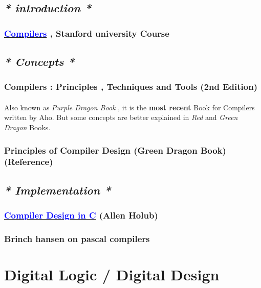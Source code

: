 \documentclass[12pt, a4paper]{article}
\begin{document}
\subsection*{\emph{* introduction *}}
\subsubsection*{\href{https://www.edx.org/course/compilers}{\textcolor{blue}{Compilers}} , Stanford university Course}
\subsection*{\emph{* Concepts *}}
\subsubsection*{Compilers : Principles , Techniques and Tools (2nd Edition)}
\paragraph{}
Also known as \emph{Purple Dragon Book} , it is the \textbf{most recent} Book for Compilers written by Aho. But some concepts are better explained in \emph{Red} and \emph{Green Dragon} Books.
\subsubsection*{}
\subsubsection*{Principles of Compiler Design (Green Dragon Book) (Reference)\\}
\subsection*{\emph{* Implementation *}}
\subsubsection*{\href{https://holub.com/compiler/}{\textcolor{blue}{Compiler Design in C}} (Allen Holub)}
\subsubsection*{Brinch hansen on pascal compilers}

\section{Digital Logic / Digital Design}
\end{document}
